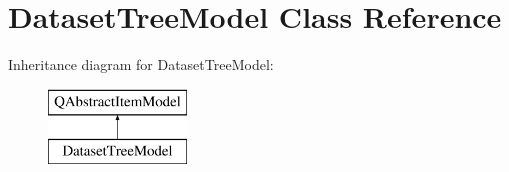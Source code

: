 \hypertarget{class_dataset_tree_model}{}\section{Dataset\+Tree\+Model Class Reference}
\label{class_dataset_tree_model}
Inheritance diagram for Dataset\+Tree\+Model\+:\begin{figure}[H]
\begin{center}
\leavevmode
\includegraphics[height=2.000000cm]{class_dataset_tree_model}
\end{center}
\end{figure}
